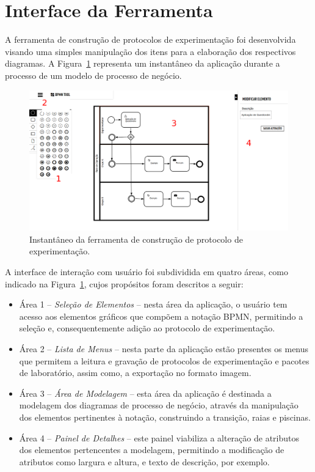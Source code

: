 \section{Interface da Ferramenta}
A ferramenta de construção de protocolos de experimentação foi desenvolvida visando uma simples manipulação dos itens para a elaboração dos respectivos diagramas. A Figura~\ref{img:janela} representa um instantâneo da aplicação durante a processo de um modelo de processo de negócio.

\begin{figure}[!htb]
\centering
\includegraphics[width=\textwidth]{images/janelaferramenta.png}
\caption{Instantâneo da ferramenta de construção de protocolo de experimentação.}
\label{img:janela}
\end{figure}

A interface de interação com usuário foi subdividida em quatro áreas, como indicado na Figura~\ref{img:janela}, cujos propósitos foram descritos a seguir:

\begin{itemize}
\item Área 1 -- \textit{Seleção de Elementos} -- nesta área da aplicação, o usuário tem acesso aos elementos gráficos que compõem a notação BPMN, permitindo a seleção e, consequentemente adição ao protocolo de experimentação.

\item Área 2 -- \textit{Lista de Menus} -- nesta parte da aplicação estão presentes os menus que permitem a leitura e gravação de protocolos de experimentação e pacotes de laboratório, assim como, a exportação no formato imagem.

\item Área 3 -- \textit{Área de Modelagem} -- esta área da aplicação é destinada a modelagem dos diagramas de processo de negócio, através da manipulação dos elementos pertinentes à notação, construindo a transição, raias e piscinas.

\item Área 4 -- \textit{Painel de Detalhes} -- este painel viabiliza a alteração de atributos dos elementos pertencentes a modelagem, permitindo a modificação de atributos como largura e altura, e texto de descrição, por exemplo.
\end{itemize}




